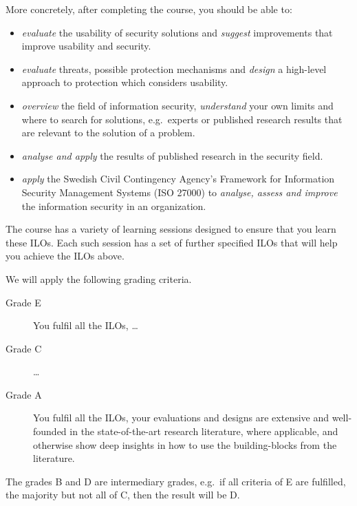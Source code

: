 More concretely, after completing the course, you should be able to:
\begin{itemize}
  \item \emph{evaluate} the usability of security solutions and \emph{suggest} 
    improvements that improve usability and security.
  \item \emph{evaluate} threats, possible protection mechanisms and 
    \emph{design} a high-level approach to protection which considers 
    usability.
  \item \emph{overview} the field of information security, \emph{understand} 
    your own limits and where to search for solutions, e.g.\ experts or 
    published research results that are relevant to the solution of a problem.
  \item \emph{analyse and apply} the results of published research in the 
    security field.
  \item \emph{apply} the Swedish Civil Contingency Agency's Framework for 
    Information Security Management Systems (ISO 27000) to \emph{analyse, assess 
      and improve} the information security in an organization.
\end{itemize}
The course has a variety of learning sessions designed to ensure that you learn 
these \acp{ILO}.
Each such session has a set of further specified \acp{ILO} that will help you 
achieve the \acp{ILO} above.

We will apply the following grading criteria.
\begin{description}
  \item[Grade E] You fulfil all the \acp{ILO}, \dots
  \item[Grade C] \dots
  \item[Grade A] You fulfil all the \acp{ILO},
    your evaluations and designs are extensive and well-founded in the 
    state-of-the-art research literature, where applicable, and otherwise show 
    deep insights in how to use the building-blocks from the literature.
\end{description}
The grades B and D are intermediary grades, e.g.\ if all criteria of E are 
fulfilled, the majority but not all of C, then the result will be D.

